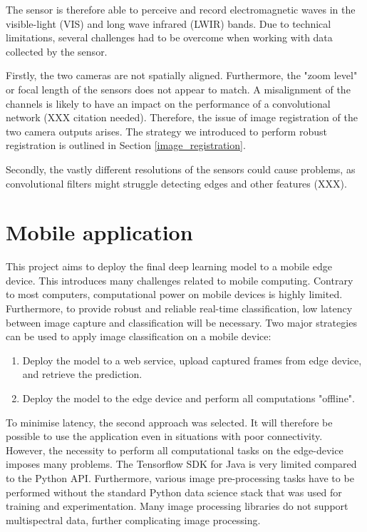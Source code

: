 \documentclass{l4proj}
\begin{document}
The sensor is therefore able to perceive and record electromagnetic waves in the visible-light (VIS) and long wave infrared (LWIR) bands. Due to technical limitations, several challenges had to be overcome when working with data collected by the sensor.

Firstly, the two cameras are not spatially aligned. Furthermore, the "zoom level" or focal length of the sensors does not appear to match. A misalignment of the channels is likely to have an impact on the performance of a convolutional network (XXX citation needed). Therefore, the issue of image registration of the two camera outputs arises. The strategy we introduced to perform robust registration is outlined in Section \ref{image_registration}.

Secondly, the vastly different resolutions of the sensors could cause problems, as convolutional filters might struggle detecting edges and other features (XXX).


\section{Mobile application}

This project aims to deploy the final deep learning model to a mobile edge device. This introduces many challenges related to mobile computing. Contrary to most computers, computational power on mobile devices is highly limited. Furthermore, to provide robust and reliable real-time classification, low latency between image capture and classification will be necessary. Two major strategies can be used to apply image classification on a mobile device:

\begin{enumerate}
  \item Deploy the model to a web service, upload captured frames from edge device, and retrieve the prediction.
  \item Deploy the model to the edge device and perform all computations "offline".
\end{enumerate}

To minimise latency, the second approach was selected. It will therefore be possible to use the application even in situations with poor connectivity. However, the necessity to perform all computational tasks on the edge-device imposes many problems. The Tensorflow SDK for Java is very limited compared to the Python API. Furthermore, various image pre-processing tasks have to be performed without the standard Python data science stack that was used for training and experimentation. Many image processing libraries do not support multispectral data, further complicating image processing.
\end{document}
